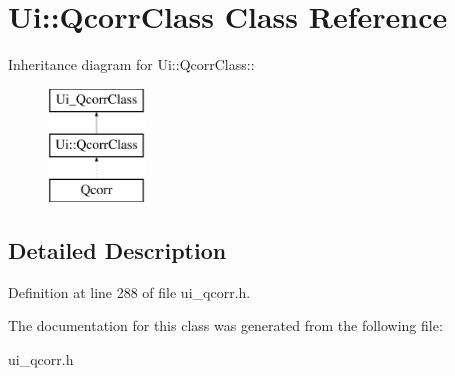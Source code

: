 \hypertarget{classUi_1_1QcorrClass}{
\section{Ui::QcorrClass Class Reference}
\label{classUi_1_1QcorrClass}
}
Inheritance diagram for Ui::QcorrClass::\begin{figure}[H]
\begin{center}
\leavevmode
\includegraphics[height=3cm]{classUi_1_1QcorrClass}
\end{center}
\end{figure}


\subsection{Detailed Description}


Definition at line 288 of file ui\_\-qcorr.h.

The documentation for this class was generated from the following file:\begin{DoxyCompactItemize}
\item 
ui\_\-qcorr.h\end{DoxyCompactItemize}
